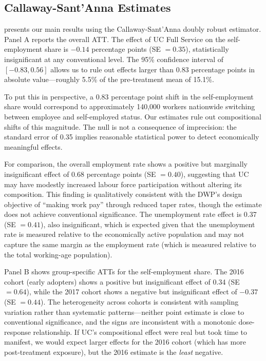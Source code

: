 \documentclass[12pt]{article}
\begin{document}


\subsection{Callaway-Sant'Anna Estimates}

 presents our main results using the Callaway-Sant'Anna doubly robust estimator. Panel A reports the overall ATT. The effect of UC Full Service on the self-employment share is $-0.14$ percentage points (SE $= 0.35$), statistically insignificant at any conventional level. The 95\% confidence interval of $[-0.83, 0.56]$ allows us to rule out effects larger than 0.83 percentage points in absolute value---roughly 5.5\% of the pre-treatment mean of 15.1\%.

To put this in perspective, a 0.83 percentage point shift in the self-employment share would correspond to approximately 140,000 workers nationwide switching between employee and self-employed status. Our estimates rule out compositional shifts of this magnitude. The null is not a consequence of imprecision: the standard error of 0.35 implies reasonable statistical power to detect economically meaningful effects.

For comparison, the overall employment rate shows a positive but marginally insignificant effect of 0.68 percentage points (SE $= 0.40$), suggesting that UC may have modestly increased labour force participation without altering its composition. This finding is qualitatively consistent with the DWP's design objective of ``making work pay'' through reduced taper rates, though the estimate does not achieve conventional significance. The unemployment rate effect is 0.37 (SE $= 0.41$), also insignificant, which is expected given that the unemployment rate is measured relative to the economically active population and may not capture the same margin as the employment rate (which is measured relative to the total working-age population).

Panel B shows group-specific ATTs for the self-employment share. The 2016 cohort (early adopters) shows a positive but insignificant effect of 0.34 (SE $= 0.64$), while the 2017 cohort shows a negative but insignificant effect of $-0.37$ (SE $= 0.44$). The heterogeneity across cohorts is consistent with sampling variation rather than systematic patterns---neither point estimate is close to conventional significance, and the signs are inconsistent with a monotonic dose-response relationship. If UC's compositional effect were real but took time to manifest, we would expect larger effects for the 2016 cohort (which has more post-treatment exposure), but the 2016 estimate is the \textit{least} negative.
\end{document}
